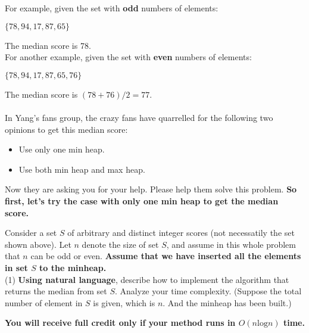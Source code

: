 \documentclass{article}
\begin{document}
For example, given the set with \textbf{odd} numbers of elements:

\begin{center}
	$\{78,94,17,87,65\}$
\end{center}

The median score is 78.\\

For another example, given the set with \textbf{even} numbers of elements:

\begin{center}
	$\{78,94,17,87,65,76\}$
\end{center}

The median score is $(78+76)/2=77$.
\paragraph{}

In Yang's fans group, the crazy fans have quarrelled for the following two opinions to get this median score:

\begin{itemize}
	\item Use only one min heap.
	\item Use both min heap and max heap.
\end{itemize}

Now they are asking you for your help. Please help them solve this problem.
\newpage
\textbf{So first, let's try the case with only one min heap to get the median score.}

Consider a set $S$ of arbitrary and distinct integer scores (not necessatily the set shown above). Let $n$ denote the size of set $S$, and assume in this whole problem that $n$ can be odd or even. \textbf{Assume that we have inserted all the elements in set $S$ to the minheap.}
~\\

(1) \textbf{Using natural language}, describe how to implement the algorithm that returns the median from set $S$. Analyze your time complexity. (Suppose the total number of element in $S$ is given, which is $n$. And the minheap has been built.)

\textbf{You will receive full credit only if your method runs in $O(n\mathrm{log}n)$ time.}

\end{document}
